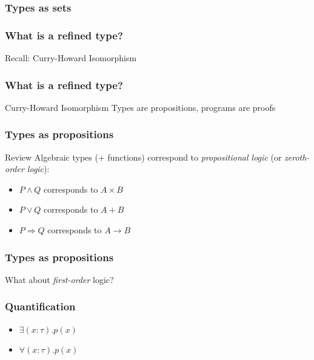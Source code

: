 \documentclass[usenames,dvipsnames]{beamer}
\begin{document}

\begin{frame}
  \frametitle{Types as sets}
\end{frame}


\begin{frame}
  \frametitle{What is a refined type?}

  Recall: Curry-Howard Isomorphism
\end{frame}


\begin{frame}
  \frametitle{What is a refined type?}

  \begin{block}{Curry-Howard Isomorphism}
    Types are propositions, programs are proofs
  \end{block}
\end{frame}


\begin{frame}
  \frametitle{Types as propositions}

  \begin{block}{Review}
    Algebraic types (+ functions) correspond to \emph{propositional logic}
    (or \emph{zeroth-order logic}):
    \begin{itemize}
      \item $P \land Q$ corresponds to $A \times B$
      \item $P \lor Q$ corresponds to $A + B$
      \item $P \Rightarrow Q$ corresponds to $A \rightarrow B$
    \end{itemize}
  \end{block}
\end{frame}


\begin{frame}
  \frametitle{Types as propositions}

  What about \emph{first-order} logic?
\end{frame}


\begin{frame}
  \frametitle{Quantification}

  \begin{itemize}
    \item $\exists (x:\tau) . p(x)$
    \item $\forall (x:\tau) . p(x)$
  \end{itemize}
\end{frame}
\end{document}

